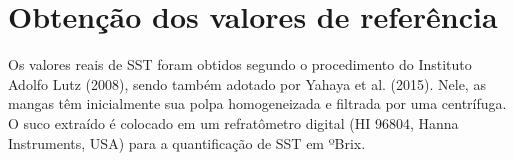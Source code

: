 \begin{figure}[H]
\end{figure}

\section{Obtenção dos valores de referência}

Os valores reais de SST foram obtidos segundo o procedimento do Instituto Adolfo Lutz (2008), sendo também adotado por Yahaya et al. (2015). Nele, as mangas têm inicialmente sua polpa homogeneizada e filtrada por uma centrífuga. O suco extraído é colocado em um refratômetro digital (HI 96804, Hanna Instruments, USA) para a quantificação de SST em ºBrix.

